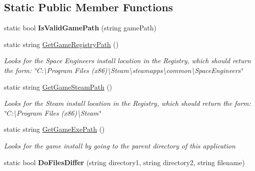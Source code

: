 \subsection*{Static Public Member Functions}
\begin{DoxyCompactItemize}
\item 
\hypertarget{class_s_e_mod_a_p_i_1_1_a_p_i_1_1_game_installation_info_a5a8c1103e3a7c3b71a25d961213b14b9}{}static bool {\bfseries Is\+Valid\+Game\+Path} (string game\+Path)\label{class_s_e_mod_a_p_i_1_1_a_p_i_1_1_game_installation_info_a5a8c1103e3a7c3b71a25d961213b14b9}

\item 
static string \hyperlink{class_s_e_mod_a_p_i_1_1_a_p_i_1_1_game_installation_info_a1391b7ceb9ac00d89fe8e7a645926337}{Get\+Game\+Registry\+Path} ()
\begin{DoxyCompactList}\small\item\em Looks for the Space Engineers install location in the Registry, which should return the form\+: \char`\"{}\+C\+:\textbackslash{}\+Program Files (x86)\textbackslash{}\+Steam\textbackslash{}steamapps\textbackslash{}common\textbackslash{}\+Space\+Engineers\char`\"{} \end{DoxyCompactList}\item 
static string \hyperlink{class_s_e_mod_a_p_i_1_1_a_p_i_1_1_game_installation_info_a4db559c331fbdd9b7ce4669be028a072}{Get\+Game\+Steam\+Path} ()
\begin{DoxyCompactList}\small\item\em Looks for the Steam install location in the Registry, which should return the form\+: \char`\"{}\+C\+:\textbackslash{}\+Program Files (x86)\textbackslash{}\+Steam\char`\"{} \end{DoxyCompactList}\item 
static string \hyperlink{class_s_e_mod_a_p_i_1_1_a_p_i_1_1_game_installation_info_a955fa6185a9bc8669dac456595127005}{Get\+Game\+Exe\+Path} ()
\begin{DoxyCompactList}\small\item\em Looks for the game install by going to the parent directory of this application \end{DoxyCompactList}\item 
\hypertarget{class_s_e_mod_a_p_i_1_1_a_p_i_1_1_game_installation_info_a0e20bda5cff6c35d48a5b1294625c3e9}{}static bool {\bfseries Do\+Files\+Differ} (string directory1, string directory2, string filename)\label{class_s_e_mod_a_p_i_1_1_a_p_i_1_1_game_installation_info_a0e20bda5cff6c35d48a5b1294625c3e9}


\end{DoxyCompactItemize}
